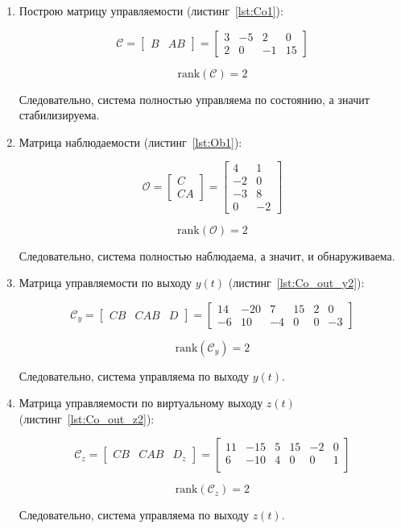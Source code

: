 \documentclass[a4paper,12pt]{article}
\begin{document}
	
	\begin{enumerate}
		\item Построю матрицу управляемости (листинг~\ref{lst:Co1}):
		
		\[
		\mathcal{C} = \begin{bmatrix} B & AB \end{bmatrix} = 
		\begin{bmatrix}
			3 & -5 & 2 & 0 \\
			2 & 0 & -1 & 15
		\end{bmatrix}
		\]
		
		\[
		\text{rank}(\mathcal{C}) = 2
		\]
		
		Следовательно, система полностью управляема по состоянию, а значит  стабилизируема.
		
		
		\item Матрица наблюдаемости (листинг~\ref{lst:Ob1}):
		
		\[
		\mathcal{O} = \begin{bmatrix} C \\ CA \end{bmatrix} = 
		\begin{bmatrix}
			4 & 1 \\
			-2 & 0 \\
			-3 & 8 \\
			0 & -2
		\end{bmatrix}
		\]
		
		\[
		\text{rank}(\mathcal{O}) = 2
		\]
		
		Следовательно, система полностью наблюдаема, а значит, и обнаруживаема.
		
		\item Матрица управляемости по выходу $y(t)$ (листинг~\ref{lst:Co_out_y2}):
		
		\[
		\mathcal{C}_{y} = \begin{bmatrix} CB & CAB & D \end{bmatrix} = 
		\begin{bmatrix}
			14 & -20 & 7 & 15 & 2 & 0 \\
			-6 & 10 & -4 & 0 & 0 & -3
		\end{bmatrix}
		\]
		
		\[
		\text{rank}(\mathcal{C}_{y}) = 2
		\]
		
		Следовательно, система управляема по выходу $y(t)$.
		
		\item Матрица управляемости по виртуальному выходу $z(t)$ (листинг~\ref{lst:Co_out_z2}):
		
		\[
		\mathcal{C}_{z} = \begin{bmatrix} CB & CAB & D_z \end{bmatrix} = 
		\begin{bmatrix}
			11  & -15   &  5   & 15   & -2   &  0\\
			6   &-10    & 4   &  0  &   0   &  1\\
		\end{bmatrix}
		\]
		
		\[
		\text{rank}(\mathcal{C}_{z}) = 2
		\]
		
		Следовательно, система управляема по выходу $z(t)$.
		

	\end{enumerate}
	
\end{document}
